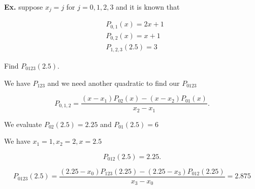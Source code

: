\documentclass[12pt]{article}
\newcommand{\Ex}{\textbf{Ex.}\xspace}
\begin{document}
\Ex suppose $x_j = j$ for $j=0,1,2,3$ and it is known that 

\begin{align*}
  &P_{0,1}(x) = 2x+1 \\
  &P_{0,2}(x) = x+1 \\
  &P_{1,2,3}(2.5) = 3
\end{align*}

Find $P_{0123}(2.5)$.

We have $P_{123}$ and we need another quadratic to find our $P_{0123}$

\[
P_{0,1,2} = \frac{(x-x_1)P_{02} (x) - (x-x_2) P_{01}(x)}{x_2 - x_1}
.\]

We evaluate $P_{02}(2.5) = 2.25$ and $P_{01}(2.5) = 6$

We have $x_1 = 1, x_2 = 2, x=2.5$

\[
  P_{012}(2.5) = 2.25 
.\]

\[
  P_{0123}(2.5) = \frac{(2.25-x_0)P_{123}(2.25) - (2.25-x_3)P_{012}(2.25)}{x_3 -
  x_0} = 2.875
\]
\end{document}
